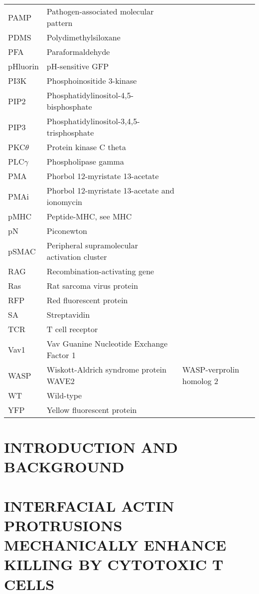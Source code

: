 \documentclass[phd,tocprelim]{cornell}
\begin{document}
\begin{table}
\begin{tabular}{l m{10cm} l}
	PAMP & Pathogen-associated molecular pattern \\
	PDMS & Polydimethylsiloxane \\
	PFA & Paraformaldehyde \\
	pHluorin & pH-sensitive GFP \\
	PI3K & Phosphoinositide 3-kinase \\
	PIP2 & Phosphatidylinositol-4,5-bisphosphate \\
	PIP3 & Phosphatidylinositol-3,4,5-trisphosphate \\
	PKC$\theta$ & Protein kinase C theta \\
	PLC$\gamma$ & Phospholipase gamma \\
	PMA & Phorbol 12-myristate 13-acetate \\
	PMAi & Phorbol 12-myristate 13-acetate and ionomycin \\
	pMHC & Peptide-MHC, see MHC \\
	pN & Piconewton \\
	pSMAC & Peripheral supramolecular activation cluster \\
	RAG & Recombination-activating gene \\
	Ras & Rat sarcoma virus protein \\
	RFP & Red fluorescent protein \\
	SA & Streptavidin \\
	TCR & T cell receptor \\
	Vav1 & Vav Guanine Nucleotide Exchange Factor 1 \\
	WASP & Wiskott-Aldrich syndrome protein
	WAVE2 & WASP-verprolin homolog 2 \\
	WT & Wild-type \\
	YFP & Yellow fluorescent protein \\
	\bottomrule
	\end{tabular}
	\label{tab:abbreviations}
\end{table}
%

\chapter{INTRODUCTION AND BACKGROUND}


\chapter{INTERFACIAL ACTIN PROTRUSIONS MECHANICALLY ENHANCE KILLING BY CYTOTOXIC T CELLS }
\label{chap:protrusions}

\end{document}
